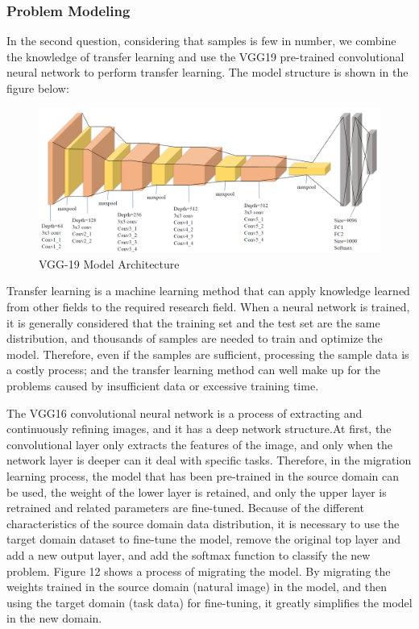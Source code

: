 \documentclass{mcmthesis}
\begin{document}
\subsubsection{Problem Modeling}
In the second question, considering that  samples is few in number, we combine the knowledge of transfer learning and use the VGG19 pre-trained convolutional neural network to perform transfer learning. The model structure is shown in the figure below:

\begin{figure}[H]
	\centering
	\includegraphics[width=\textwidth]{screenshot009}
	\caption{VGG-19 Model Architecture}
	\label{fig:screenshot009}
\end{figure}

Transfer learning is a machine learning method that can apply knowledge learned from other fields to the required research field. When a neural network is trained, it is generally considered that the training set and the test set are the same distribution, and thousands of samples are needed to train and optimize the model. Therefore, even if the samples are sufficient, processing the sample data is a costly process; and the transfer learning method can well make up for the problems caused by insufficient data or excessive training time.

The VGG16 convolutional neural network is a process of extracting and continuously refining images, and it has a deep network structure.At first, the convolutional layer only extracts the features of the image, and only when the network layer is deeper can it deal with specific tasks. Therefore, in the migration learning process, the model that has been pre-trained in the source domain can be used, the weight of the lower layer is retained, and only the upper layer is retrained and related parameters are fine-tuned. Because of the different characteristics of the source domain data distribution, it is necessary to use the target domain dataset to fine-tune the model, remove the original top layer and add a new output layer, and add the softmax function to classify the new problem. Figure 12 shows a process of migrating the model. By migrating the weights trained in the source domain (natural image) in the model, and then using the target domain (task data) for fine-tuning, it greatly simplifies the model in the new domain. 
\end{document}
